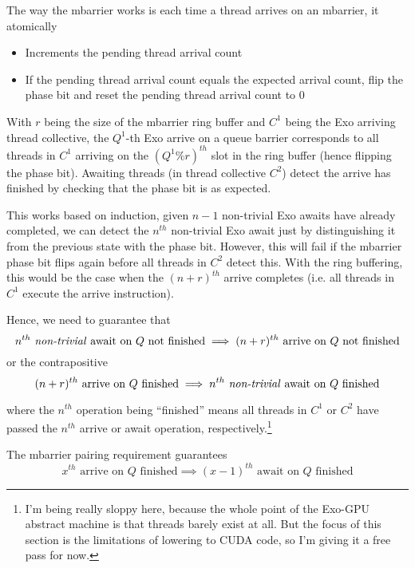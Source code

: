 \filbreak
The way the mbarrier works is each time a thread arrives on an mbarrier, it atomically
\begin{itemize}
\item Increments the pending thread arrival count
\filbreak
\item If the pending thread arrival count equals the expected arrival count, flip the phase bit and reset the pending thread arrival count to 0
\end{itemize}
\filbreak
With $r$ being the size of the mbarrier ring buffer and $C^1$ being the Exo arriving thread collective, the $Q^1$-th Exo arrive on a queue barrier corresponds to all threads in $C^1$ arriving on the $(Q^1 \% r)^{th}$ slot in the ring buffer (hence flipping the phase bit).
Awaiting threads (in thread collective $C^2$) detect the arrive has finished by checking that the phase bit is as expected.

\filbreak
This works based on induction, given $n-1$ non-trivial Exo awaits have already completed, we can detect the $n^{th}$ non-trivial Exo await just by distinguishing it from the previous state with the phase bit.
However, this will fail if the mbarrier phase bit flips again before all threads in $C^2$ detect this.
With the ring buffering, this would be the case when the $(n+r)^{th}$ arrive completes (i.e. all threads in $C^1$ execute the arrive instruction).

\filbreak
Hence, we need to guarantee that
\begin{equation*}
  n^{th} \text{ \textit{non-trivial} await on $Q$ not finished} \implies (n+r)^{th} \text{ arrive on $Q$ not finished}
\end{equation*}
or the contrapositive
\begin{equation*}
  (n+r)^{th} \text{ arrive on $Q$ finished} \implies n^{th} \text{ \textit{non-trivial} await on $Q$ finished}
\end{equation*}

\filbreak
where the $n^{th}$ operation being ``finished'' means all threads in $C^1$ or $C^2$ have passed the $n^{th}$ arrive or await operation, respectively.\footnote{I'm being really sloppy here, because the whole point of the Exo-GPU abstract machine is that threads barely exist at all. But the focus of this section is the limitations of lowering to CUDA code, so I'm giving it a free pass for now.}

\filbreak
{}
The mbarrier pairing requirement guarantees
\begin{equation*}
  x^{th} \text{ arrive on $Q$ finished} \implies (x-1)^{th} \text{ await on $Q$ finished}
\end{equation*}


